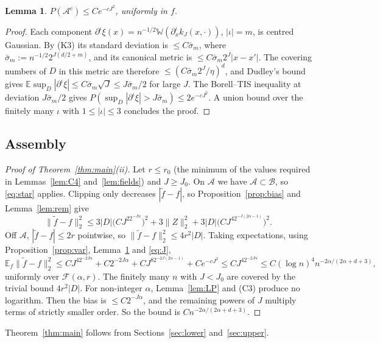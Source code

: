 \documentclass[11pt]{article}
\newtheorem{lemma}[theorem]{Lemma}
\theoremstyle{definition}
\theoremstyle{remark}
\newcommand{\E}{\mathbb E}
\newcommand{\W}{\mathbb W}
\newcommand{\Fc}{\mathcal F}
\newcommand{\rate}{n^{-2\alpha/(2\alpha+d+3)}}
\newcommand{\cA}{\mathcal A}
\newcommand{\cB}{\mathcal B}
\begin{document}
\begin{lemma}\label{lem:bad}
$P(\cA^c)\le Ce^{-cJ^2}$, uniformly in $f$.
\end{lemma}

\begin{proof}
Each component $\partial^\iota\xi(x)=n^{-1/2}\W(\partial^\iota_xk_J(x,\cdot))$, $|\iota|=m$, is centred Gaussian. By (K3) its standard deviation is $\le C\bar\sigma_m$, where $\bar\sigma_m:=n^{-1/2}2^{J(d/2+m)}$, and its canonical metric is $\le C\bar\sigma_m2^J|x-x'|$. The covering numbers of $D$ in this metric are therefore $\le(C\bar\sigma_m2^J/\eta)^d$, and Dudley's bound gives $\E\sup_D|\partial^\iota\xi|\le C\bar\sigma_m\sqrt J\le J\bar\sigma_m/2$ for large $J$. The Borell--TIS inequality at deviation $J\bar\sigma_m/2$ gives $P(\sup_D|\partial^\iota\xi|>J\bar\sigma_m)\le2e^{-cJ^2}$. A union bound over the finitely many $\iota$ with $1\le|\iota|\le3$ concludes the proof.
\end{proof}

\subsection{Assembly}

\begin{proof}[Proof of Theorem~\ref{thm:main}(ii)]
Let $r\le r_0$ (the minimum of the values required in Lemmas~\ref{lem:C4} and~\ref{lem:fields}) and $J\ge J_0$. On $\cA$ we have $\cA\subset\cB$, so \eqref{eq:star} applies. Clipping only decreases $|\tilde f-f|$, so Proposition~\ref{prop:bias} and Lemma~\ref{lem:rem} give
\[
\|\tilde f-f\|_2^2\le3|D|\big(CJ^22^{-J\alpha}\big)^2+3\|Z\|_2^2+3|D|\big(CJ^42^{-J(2\alpha-1)}\big)^2 .
\]
Off $\cA$, $|\tilde f-f|\le2r$ pointwise, so $\|\tilde f-f\|_2^2\le4r^2|D|$. Taking expectations, using Proposition~\ref{prop:var}, Lemma~\ref{lem:bad} and \eqref{eq:J},
\[
\E_f\|\tilde f-f\|_2^2\le CJ^42^{-2J\alpha}+C2^{-2J\alpha}+CJ^82^{-2J(2\alpha-1)}+Ce^{-cJ^2}\le CJ^42^{-2J\alpha}\le C(\log n)^4\rate,
\]
uniformly over $\Fc(\alpha,r)$. The finitely many $n$ with $J<J_0$ are covered by the trivial bound $4r^2|D|$. For non-integer $\alpha$, Lemma~\ref{lem:LP} and (C3) produce no logarithm. Then the bias is $\le C2^{-J\alpha}$, and the remaining powers of $J$ multiply terms of strictly smaller order. So the bound is $C\rate$.
\end{proof}

Theorem~\ref{thm:main} follows from Sections~\ref{sec:lower} and~\ref{sec:upper}.
\end{document}

